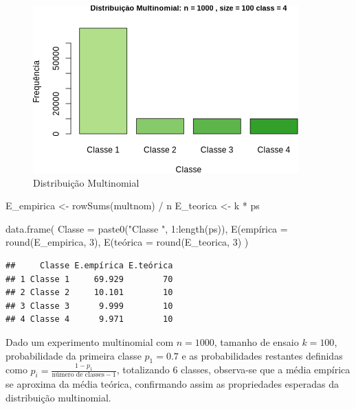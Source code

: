 \documentclass[
]{article}
\newenvironment{Shaded}{\begin{snugshade}}{\end{snugshade}}
\newcommand{\AttributeTok}[1]{\textcolor[rgb]{0.77,0.63,0.00}{#1}}
\newcommand{\DecValTok}[1]{\textcolor[rgb]{0.00,0.00,0.81}{#1}}
\newcommand{\FunctionTok}[1]{\textcolor[rgb]{0.00,0.00,0.00}{#1}}
\newcommand{\NormalTok}[1]{#1}
\newcommand{\OtherTok}[1]{\textcolor[rgb]{0.56,0.35,0.01}{#1}}
\newcommand{\SpecialCharTok}[1]{\textcolor[rgb]{0.00,0.00,0.00}{#1}}
\newcommand{\StringTok}[1]{\textcolor[rgb]{0.31,0.60,0.02}{#1}}
\begin{document}
\begin{figure}

{\centering \includegraphics{7_activity_files/figure-latex/multinom-plot-1} 

}

\caption{Distribuição Multinomial}\label{fig:multinom-plot}
\end{figure}

\begin{Shaded}
\begin{Highlighting}[]
\NormalTok{E\_empirica }\OtherTok{\textless{}{-}} \FunctionTok{rowSums}\NormalTok{(multnom) }\SpecialCharTok{/}\NormalTok{ n}
\NormalTok{E\_teorica }\OtherTok{\textless{}{-}}\NormalTok{ k }\SpecialCharTok{*}\NormalTok{ ps}

\FunctionTok{data.frame}\NormalTok{(}
  \AttributeTok{Classe =} \FunctionTok{paste0}\NormalTok{(}\StringTok{"Classe "}\NormalTok{, }\DecValTok{1}\SpecialCharTok{:}\FunctionTok{length}\NormalTok{(ps)),}
  \StringTok{\textasciigrave{}}\AttributeTok{E(empírica}\StringTok{\textasciigrave{}} \OtherTok{=} \FunctionTok{round}\NormalTok{(E\_empirica, }\DecValTok{3}\NormalTok{),}
  \StringTok{\textasciigrave{}}\AttributeTok{E(teórica}\StringTok{\textasciigrave{}} \OtherTok{=} \FunctionTok{round}\NormalTok{(E\_teorica, }\DecValTok{3}\NormalTok{)}
\NormalTok{)}
\end{Highlighting}
\end{Shaded}

\begin{verbatim}
##     Classe E.empírica E.teórica
## 1 Classe 1     69.929        70
## 2 Classe 2     10.101        10
## 3 Classe 3      9.999        10
## 4 Classe 4      9.971        10
\end{verbatim}

Dado um experimento multinomial com \(n = 1000\), tamanho de ensaio \(k = 100\), probabilidade da primeira classe \(p_1 = 0.7\) e as probabilidades restantes definidas como \(p_i = \frac{1 - p_1}{\text{número de classes} - 1}\), totalizando 6 classes, observa-se que a média empírica se aproxima da média teórica, confirmando assim as propriedades esperadas da distribuição multinomial.
\end{document}
